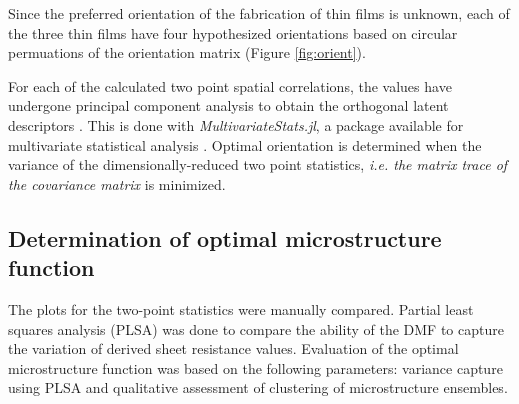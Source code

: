 Since the preferred orientation of the fabrication of thin films is unknown, each of the three thin films have four hypothesized orientations based on circular permuations of the orientation matrix (Figure \ref{fig:orient}).

For each of the calculated two point spatial correlations, the values have undergone principal component analysis to obtain the orthogonal latent descriptors \cite{gupta15, sun17}.
This is done with \emph{MultivariateStats.jl}, a package available for multivariate statistical analysis \cite{mvstats}.
Optimal orientation is determined when the variance of the dimensionally-reduced two point statistics, \textit{i.e. the matrix trace of the covariance matrix} is minimized.

\subsection{Determination of optimal microstructure function}
The plots for the two-point statistics were manually compared.
Partial least squares analysis (PLSA) was done to compare the ability of the DMF to capture the variation of derived sheet resistance values.
Evaluation of the optimal microstructure function was based on the following parameters: variance capture using PLSA and qualitative assessment of clustering of microstructure ensembles.
